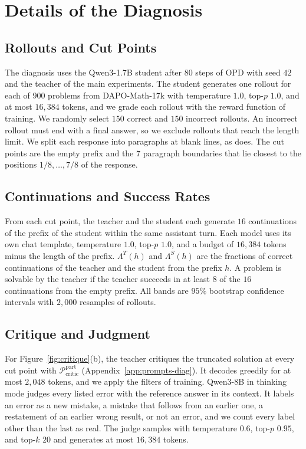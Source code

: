 \section{Details of the Diagnosis}
\label{app:diagnosis}

\subsection{Rollouts and Cut Points}

The diagnosis uses the Qwen3-1.7B student after $80$ steps of OPD with seed $42$
and the teacher of the main experiments.
The student generates one rollout for each of $900$ problems from
DAPO-Math-17k with temperature $1.0$, top-$p$ $1.0$, and at most $16{,}384$
tokens, and we grade each rollout with the reward function of training.
We randomly select $150$ correct and $150$ incorrect rollouts.
An incorrect rollout must end with a final answer, so we exclude rollouts that
reach the length limit.
We split each response into paragraphs at blank lines, as \ours{} does.
The cut points are the empty prefix and the $7$ paragraph boundaries that lie
closest to the positions $1/8, \dots, 7/8$ of the response.

\subsection{Continuations and Success Rates}

From each cut point, the teacher and the student each generate $16$
continuations of the prefix of the student within the same assistant turn.
Each model uses its own chat template, temperature $1.0$, top-$p$ $1.0$, and a
budget of $16{,}384$ tokens minus the length of the prefix.
$\Lambda^T(h)$ and $\Lambda^S(h)$ are the fractions of correct continuations of
the teacher and the student from the prefix $h$.
A problem is solvable by the teacher if the teacher succeeds in at least $8$ of
the $16$ continuations from the empty prefix.
All bands are $95\%$ bootstrap confidence intervals with $2{,}000$ resamples of
rollouts.

\subsection{Critique and Judgment}

For Figure~\ref{fig:critique}(b), the teacher critiques the truncated solution at
every cut point with $\mathcal{P}_{\text{critic}}^{\text{part}}$
(Appendix~\ref{app:prompts-diag}).
It decodes greedily for at most $2{,}048$ tokens, and we apply the filters of
training.
Qwen3-8B in thinking mode judges every listed error with the reference answer in
its context.
It labels an error as a new mistake, a mistake that follows from an earlier one,
a restatement of an earlier wrong result, or not an error, and we count every
label other than the last as real.
The judge samples with temperature $0.6$, top-$p$ $0.95$, and top-$k$ $20$ and
generates at most $16{,}384$ tokens.

